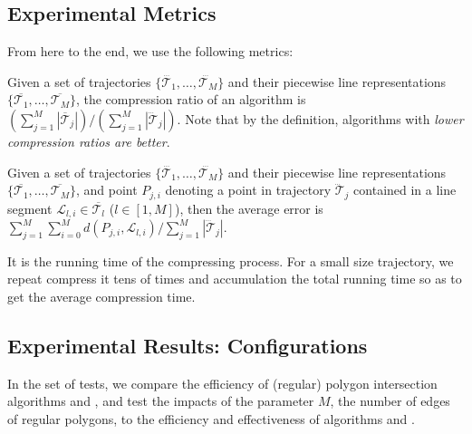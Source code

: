 \subsection{Experimental Metrics}

From here to the end, we use the following metrics:

\vspace{0.5ex}
 Given a set of trajectories $\{\dddot{\mathcal{T}_1}, \ldots, \dddot{\mathcal{T}_M}\}$ and their piecewise line representations $\{\overline{\mathcal{T}_1}, \ldots, \overline{\mathcal{T}_M}\}$, the compression ratio of an algorithm is $(\sum_{j=1}^{M} |\overline{\mathcal{T}}_j |)/(\sum_{j=1}^{M} |\dddot{\mathcal{T}}_j |)$.
Note that by the definition, algorithms with \emph{lower compression ratios are better}.

\vspace{0.5ex}
 Given a set of trajectories $\{\dddot{\mathcal{T}_1}, \ldots, \dddot{\mathcal{T}_M}\}$ and their piecewise line representations $\{\overline{\mathcal{T}_1}, \ldots, \overline{\mathcal{T}_M}\}$, and point $P_{j,i}$ denoting
a point in trajectory $\dddot{\mathcal{T}}_j$ contained in a line segment $\mathcal{L}_{l,i}\in\overline{\mathcal{T}_l}$ ($l\in[1,M]$),
then the average error is $\sum_{j=1}^{M}\sum_{i=0}^{M} d(P_{j,i},
\mathcal{L}_{l,i})/\sum_{j=1}^{M}{|\dddot{\mathcal{T}}_j |}$.

\vspace{1ex}
 It is the running time of the compressing process.
For a small size trajectory, we repeat compress it tens of times and accumulation the total running time so as to get the average compression time.


\subsection{Experimental Results: Configurations}

In the set of tests, we compare the efficiency of (regular) polygon intersection algorithms \rpia and \cpia, and test the impacts of the parameter $M$, \ie the number of edges of regular polygons, to the efficiency and effectiveness of algorithms \cist and \cista.

